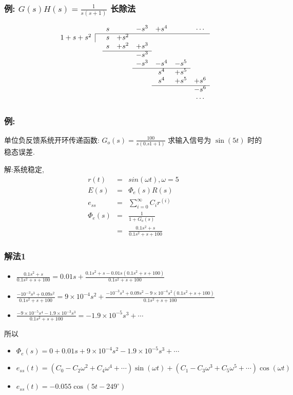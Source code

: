 \documentclass{article}
\begin{document}
\begin{frame}
\frametitle{例: $G(s)H(s)=\frac{1}{s(s+1)}$ 长除法}
\label{sec-3-3-7}

\[ 
\begin{array}{ccccccccc} 
 & & s &  & -s^3 & +s^4 &  &\cdots\\
\cline{2-8}
\multicolumn{1}{r|}{1+s+s^2} & & s & +s^2 \\
                             & & s  & +s^2 & +s^3 \\
\cline{3-5}
                             & &   &     & -s^3 \\
                             & &   &     & -s^3  & -s^4 & -s^5\\
\cline{5-7}
                             & &   &     &       &  s^4 &  +s^5\\
                             & &   &     &       &  s^4 &  +s^5  & +s^6\\
\cline{6-8}
                             & &   &     &       &      &       & -s^6\\
                             & &   &     &       &      &       & \cdots
\end{array} 
\]
\end{frame}
\begin{frame}
\frametitle{例:}
\label{sec-3-3-8}

单位负反馈系统开环传递函数: $G_o(s)=\frac{100}{s(0.s1+1)}$ 求输入信号为 $\sin(5 t)$ 时的稳态误差.

解:系统稳定,
\begin{eqnarray*}
r(t) &=& sin(\omega t),\omega=5 \\
E(s) &=& \Phi_e(s)R(s) \\
e_{ss}&=& \sum_{i=0}^{\infty}C_i r^{(i)} \\
\Phi_e(s)&=& \frac{1}{1+G_o(s)} \\
         &=& \frac{0.1s^2+s}{0.1s^2+s+100} 
\end{eqnarray*}
\end{frame}
\begin{frame}
\frametitle{解法1}
\label{sec-3-3-9}





\begin{itemize}
\item $\frac{0.1s^2+s}{0.1s^2+s+100}  =0.01s+\frac{0.1s^2+s-0.01s(0.1s^2+s+100)}{0.1s^2+s+100}$
\item $\frac{-10^{-3}s^3+0.09s^2}{0.1s^2+s+100} = 9\times 10^{-4}s^2+\frac{-10^{-3}s^3+0.09s^2-9\times 10^{-4}s^2(0.1s^2+s+100)}{0.1s^2+s+100}$
\item $\frac{-9\times 10^{-5}s^4-1.9\times 10^{-3}s^3}{0.1s^2+s+100}  = -1.9\times 10^{-5}s^3 + \cdots$
\end{itemize}
所以
\begin{itemize}
\item $\Phi_e(s) = 0+0.01s+9\times 10^{-4}s^2-1.9\times 10^{-5}s^3+\cdots$
\item $e_{ss}(t) = (C_0-C_2\omega^2+C_4\omega^4+\cdots)\sin(\omega t)+(C_1-C_3\omega^3+C_5\omega^5+\cdots)\cos(\omega t)$
\item $e_{ss}(t) = -0.055\cos(5t-249^{\circ})$
\end{itemize}
\end{frame}
\end{document}
